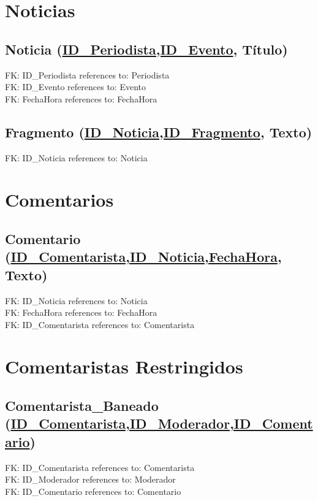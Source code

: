 \documentclass{article}
\newcommand{\diseno}[3]{\subsection{\textbf{{#1}} ({\underline{#2},} #3)}}
\newcommand{\relation}[2]{\subsection{\textbf{{#1}} ({\underline{#2}})}}
\newcommand{\fk}[2]{\noindent FK: #1 references to: #2 \\}
\begin{document}
\section{Noticias}
\diseno{Noticia}{ID\_Periodista,ID\_Evento}{Título}
\fk{ID\_Periodista}{Periodista}
\fk{ID\_Evento}{Evento}
\fk{Fecha\-Hora}{Fecha\-Hora}
\diseno{Fragmento}{ID\_Noticia,ID\_Fragmento}{Texto}
\fk{ID\_Noticia}{Noticia}

\section{Comentarios}
\diseno{Comentario}{ID\_Comentarista,ID\_Noticia,Fecha\-Hora}{Texto}
\fk{ID\_Noticia}{Noticia}
\fk{Fecha\-Hora}{Fecha\-Hora}
\fk{ID\_Comentarista}{Comentarista}

\section{Comentaristas Restringidos}
\relation{Comentarista\_Baneado}{ID\_Comentarista,ID\_Moderador,ID\_Comentario}
\fk{ID\_Comentarista}{Comentarista}
\fk{ID\_Moderador}{Moderador}
\fk{ID\_Comentario}{Comentario}
\end{document}
